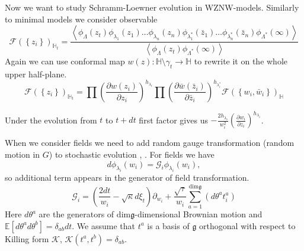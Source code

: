 \documentclass[a4paper]{jpconf}
\theoremstyle{definition}
\newcommand{\gf}{\mathfrak{g}}
\theoremstyle{definition} \newtheorem{Def}{Definition}
\begin{document}
Now we want to study Schramm-Loewner evolution in WZNW-models.
Similarly to minimal models we consider observable
\begin{equation*}
  \mathcal{F}(\left\{z_{i}\right\})_{\mathbb{H}_{t}}=
  \frac{\left<\phi_{\Lambda}(z_{t}) \phi_{\lambda_1}(z_{1}) \dots \phi_{\lambda_n}(z_{n}) \phi_{\lambda^{*}_1}(\bar z_{1}) \dots \phi_{\lambda^{*}_n}(\bar z_{n})
      \phi_{\Lambda^{*}}(\infty)\right>}{\left<\phi_{\Lambda}(z_{t})\phi_{\Lambda^{*}}(\infty)\right>}
\end{equation*}
Again we can use conformal map  $w(z):\mathbb{H}\setminus\gamma_{t}\to \mathbb{H}$ to rewrite it on the whole upper half-plane. 
\begin{equation*}
  \mathcal{F}(\left\{z_{i}\right\})_{\mathbb{H}_{t}}=\prod \left(\frac{\partial w(z_{i})}{\partial z_{i}}\right)^{h_{\lambda_i}} 
  \prod \left(\frac{\partial \bar w(\bar z_{i})}{\partial \bar z_{i}}\right)^{h_{\lambda^{*}_i}}
  \mathcal{F}(\left\{w_{i}, \bar w_{i}\right\})_{\mathbb{H}}
\end{equation*}

Under the evolution from $t$ to $t+dt$ first factor gives us $-\frac{2h_{\lambda_{i}}}{w_{i}^{2}}\left(\frac{\partial w_{i}}{\partial z_{i}}\right)^{h_{\lambda_{i}}}$.

When we consider fields we need to add random gauge transformation (random motion in $G$) to stochastic evolution \cite{bettelheim2005stochastic}, \cite{alekseev2010sle}. 
For fields we have
\begin{equation*}
  d\phi_{\lambda_{i}}(w_{i}) = \mathcal{G}_{i}\phi_{\lambda_{i}}(w_{i}),
\end{equation*}
so additional term appears in the generator of field transformation. 
\begin{equation}
  \mathcal{G}_{i}=\left(\frac{2dt}{w_{i}}-\sqrt{\kappa} d\xi_{t}\right) \partial_{w_{i}}+\frac{\sqrt{\tau}}{w_{i}}\sum_{a=1}^{\mathrm{dim} \gf}\left(d \theta ^{a} t^{a}_{i}\right)
\label{eq:18}
\end{equation}
Here $d\theta^{a}$ are the generators of $\mathrm{dim}\gf$-dimensional Brownian motion and $\mathbb{E}[d\theta^{a}d\theta^{b}]=\delta_{ab}dt$. We assume that $t^{a}$ is a basis of $\gf$ orthogonal with respect to Killing form $\mathcal{K}$, $\mathcal{K}(t^{a},t^{b})=\delta_{ab}$.
\end{document}
